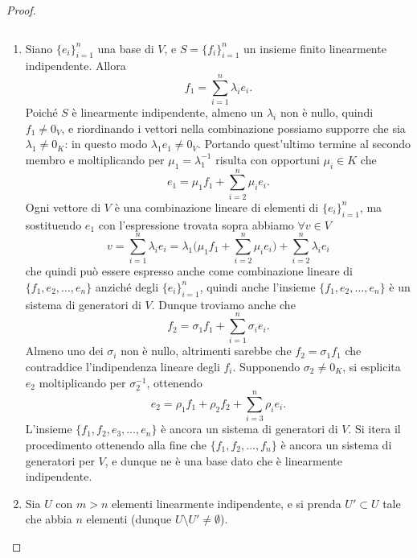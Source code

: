 \begin{proof}
\begin{verbatim}
\end{verbatim}
	\begin{enumerate}
		\item Siano $\{  e_i\}_{i=1}^n$ una base di $V$, e $S=\{  f_i\}_{i=1}^n$ un insieme finito linearmente indipendente.
			Allora
			\begin{equation*}
				  f_1=\sum_{i=1}^n\lambda_i  e_i.
			\end{equation*}
			Poiché $S$ è linearmente indipendente, almeno un $\lambda_i$ non è nullo, quindi $  f_1\neq 0_V$, e riordinando i vettori nella combinazione possiamo supporre che sia $\lambda_1\neq 0_K$: in questo modo $\lambda_1  e_1\neq 0_V$.
			Portando quest'ultimo termine al secondo membro e moltiplicando per $\mu_1=\lambda_1^{-1}$ risulta con opportuni $\mu_i\in K$ che
			\begin{equation*}
				  e_1=\mu_1  f_1+\sum_{i=2}^n\mu_i  e_i.
			\end{equation*}
			Ogni vettore di $V$ è una combinazione lineare di elementi di $\{  e_i\}_{i=1}^n$, ma sostituendo $  e_1$ con l'espressione trovata sopra abbiamo $\forall  v\in V$
			\begin{equation*}
				  v=\sum_{i=1}^n\lambda_i  e_i=\lambda_1\bigg(\mu_1  f_1+\sum_{i=2}^n\mu_i  e_i\bigg)+\sum_{i=2}^n\lambda_i  e_i
			\end{equation*}
			che quindi può essere espresso anche come combinazione lineare di $\{  f_1,  e_2,\dots,  e_n\}$ anziché degli $\{  e_i\}_{i=1}^n$, quindi anche l'insieme $\{  f_1,  e_2,\dots,  e_n\}$ è un sistema di generatori di $V$.
			Dunque troviamo anche che
			\begin{equation*}
				  f_2=\sigma_1  f_1+\sum_{i=1}^n\sigma_i  e_i.
			\end{equation*}
			Almeno uno dei $\sigma_i$ non è nullo, altrimenti sarebbe che $  f_2=\sigma_1  f_1$ che contraddice l'indipendenza lineare degli $  f_i$.
			Supponendo $\sigma_2\neq 0_K$, si esplicita $  e_2$ moltiplicando per $\sigma_2^{-1}$, ottenendo
			\begin{equation*}
				  e_2=\rho_1  f_1+\rho_2  f_2+\sum_{i=3}^n\rho_i  e_i.
			\end{equation*}
			L'insieme $\{  f_1,  f_2,  e_3,\dots,  e_n\}$ è ancora un sistema di generatori di $V$.
			Si itera il procedimento ottenendo alla fine che $\{  f_1,  f_2,\dots,  f_n\}$ è ancora un sistema di generatori per $V$, e dunque ne è una base dato che è linearmente indipendente. 
		\item Sia $U$ con $m>n$ elementi linearmente indipendente, e si prenda $U'\subset U$ tale che abbia $n$ elementi (dunque $U\setminus U'\neq\emptyset$).

\end{enumerate}
\end{proof}
